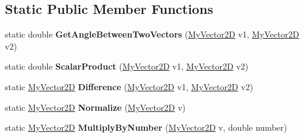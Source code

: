 \subsection*{Static Public Member Functions}
\begin{DoxyCompactItemize}
\item 
\mbox{\label{class_chess_tracking_1_1_utils_1_1_my_vector2_d_adcfc28f5aeef67573eba388c87aafbec}} 
static double {\bfseries Get\+Angle\+Between\+Two\+Vectors} (\mbox{\hyperlink{class_chess_tracking_1_1_utils_1_1_my_vector2_d}{My\+Vector2D}} v1, \mbox{\hyperlink{class_chess_tracking_1_1_utils_1_1_my_vector2_d}{My\+Vector2D}} v2)
\item 
\mbox{\label{class_chess_tracking_1_1_utils_1_1_my_vector2_d_a6f213c4e521b194ef8486638a78c937b}} 
static double {\bfseries Scalar\+Product} (\mbox{\hyperlink{class_chess_tracking_1_1_utils_1_1_my_vector2_d}{My\+Vector2D}} v1, \mbox{\hyperlink{class_chess_tracking_1_1_utils_1_1_my_vector2_d}{My\+Vector2D}} v2)
\item 
\mbox{\label{class_chess_tracking_1_1_utils_1_1_my_vector2_d_a36b84c9a9940c219e96c8f2d587933d0}} 
static \mbox{\hyperlink{class_chess_tracking_1_1_utils_1_1_my_vector2_d}{My\+Vector2D}} {\bfseries Difference} (\mbox{\hyperlink{class_chess_tracking_1_1_utils_1_1_my_vector2_d}{My\+Vector2D}} v1, \mbox{\hyperlink{class_chess_tracking_1_1_utils_1_1_my_vector2_d}{My\+Vector2D}} v2)
\item 
\mbox{\label{class_chess_tracking_1_1_utils_1_1_my_vector2_d_a7bcd59259c62abfe5afdf285911aa688}} 
static \mbox{\hyperlink{class_chess_tracking_1_1_utils_1_1_my_vector2_d}{My\+Vector2D}} {\bfseries Normalize} (\mbox{\hyperlink{class_chess_tracking_1_1_utils_1_1_my_vector2_d}{My\+Vector2D}} v)
\item 
\mbox{\label{class_chess_tracking_1_1_utils_1_1_my_vector2_d_a1701dc6fb8882c6c91eb61789209fb7c}} 
static \mbox{\hyperlink{class_chess_tracking_1_1_utils_1_1_my_vector2_d}{My\+Vector2D}} {\bfseries Multiply\+By\+Number} (\mbox{\hyperlink{class_chess_tracking_1_1_utils_1_1_my_vector2_d}{My\+Vector2D}} v, double number)

\end{DoxyCompactItemize}
